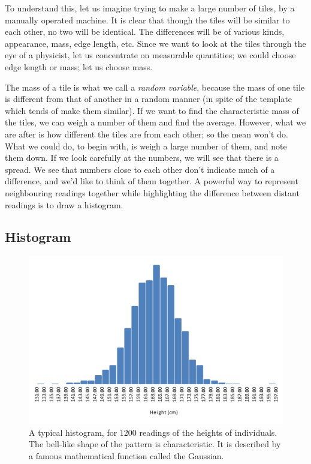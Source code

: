 To understand this, let us imagine trying to make a large number of tiles, by a manually operated machine. It is clear that though the tiles will be similar to each other, no two will be identical. The differences will be of various kinds, appearance, mass, edge length, etc. Since we want to look at the tiles through the eye of a physicist, let us concentrate on measurable quantities; we could choose edge length or mass; let us choose mass. 

The mass of a tile is what we call a \textit{random variable}, because the mass of one tile is different from that of another in a random manner (in spite of the template which tends of make them similar). If we want to find the characteristic mass of the tiles, we can weigh a number of them and find the average. However, what we are after is how different the tiles are from each other; so the mean won't do. What we could do, to begin with, is weigh a large number of them, and note them down. If we look carefully at the numbers, we will see that there is a spread. We see that numbers close to each other don't indicate much of a difference, and we'd like to think of them together. A powerful way to represent neighbouring readings together while highlighting the difference between distant readings is to draw a histogram. 

\subsection{Histogram}

\begin{figure}[!htb]
    \centering
    \includegraphics[scale=0.75]{figs/data-gaussian.png}
    \caption{A typical histogram, for 1200 readings of the heights of individuals. The bell-like shape of the pattern is characteristic. It is described by a famous mathematical function called the Gaussian. }
    \label{fig:data-gaussian}
\end{figure}

